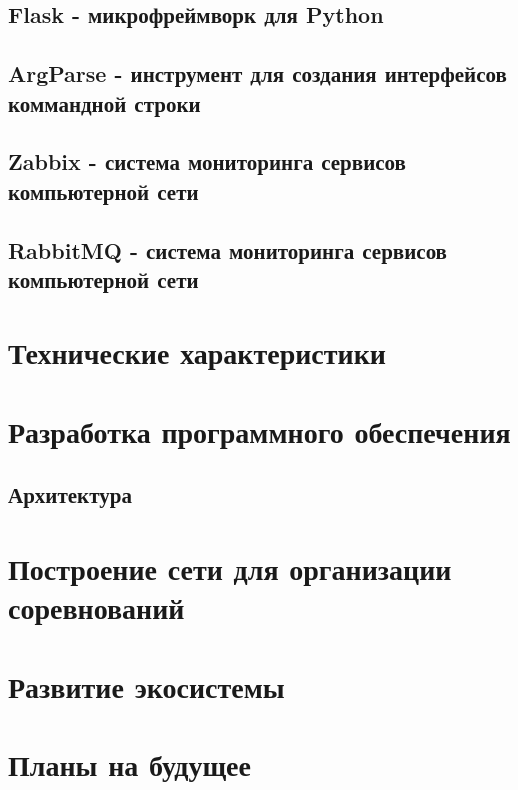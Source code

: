 \subsection{Flask - микрофреймворк для Python}

\subsection{ArgParse - инструмент для создания интерфейсов коммандной строки}

\subsection{Zabbix - система мониторинга сервисов компьютерной сети}

\subsection{RabbitMQ - система мониторинга сервисов компьютерной сети}

\newpage
\section{Технические характеристики}

\newpage
\section{Разработка программного обеспечения}
\setcounter{figure}{0}
\subsection{Архитектура}


\newpage
\section{Построение сети для организации соревнований}
\setcounter{figure}{0}



\newpage
\section{Развитие экосистемы}
\setcounter{figure}{0}
 


\newpage
\section{Планы на будущее}


